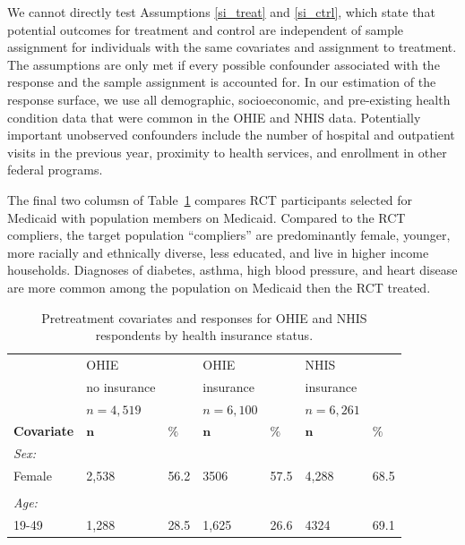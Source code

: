 \documentclass[hidelinks,12pt]{article}
\begin{document}
{We cannot directly test Assumptions \ref{si_treat} and \ref{si_ctrl}, which state that potential outcomes for treatment and control are independent of sample assignment for individuals with the same covariates and assignment to treatment. The assumptions are only met if every possible confounder associated with the response and the sample assignment is accounted for. In our estimation of the response surface, we use all demographic, socioeconomic, and pre-existing health condition data that were common in the OHIE and NHIS data. Potentially important unobserved confounders include the number of hospital and outpatient visits in the previous year, proximity to health services, and enrollment in other federal programs. 

The final two columsn of Table~\ref{rct-nrt-compare} compares RCT participants selected for Medicaid with population members on Medicaid. Compared to the RCT compliers, the target population ``compliers''  are predominantly female, younger, more racially and ethnically diverse, less educated, and live in higher income households. Diagnoses of diabetes, asthma, high blood pressure, and heart disease are more common among the population on Medicaid then the RCT treated.

\begin{singlespace}
\begin{longtable}{lllllll}
\caption{Pretreatment covariates and responses for OHIE and NHIS respondents by health insurance status.\label{rct-nrt-compare}} \\
  & OHIE &  & OHIE &  & NHIS &  \\ 
    & no insurance &  & insurance &  &insurance &   \\ 
  & $n=4,519$ &  & $n=6,100$ &  & $n=6,261$ &  \\  
  \hline   
    \hline   
 \textbf{Covariate} &  $\mathbf{n}$ & $\mathbf{\%}$ & $\mathbf{n}$ & $\mathbf{\%}$ & $\mathbf{n}$ & $\mathbf{\%}$ \\ 
\hline
\textit{Sex:} &  & & &  &  & \\ 

\hspace{3mm} Female & 2,538 & 56.2 & 3506 & 57.5 & 4,288 & 68.5 \\ 
 &  & & &  &  & \\ 
\textit{Age:} &  & & &  &  & \\ 
\hspace{3mm}19-49 & 1,288 & 28.5 & 1,625 & 26.6 & 4324 & 69.1  \\ 


\end{longtable}
\end{singlespace}}
\end{document}
